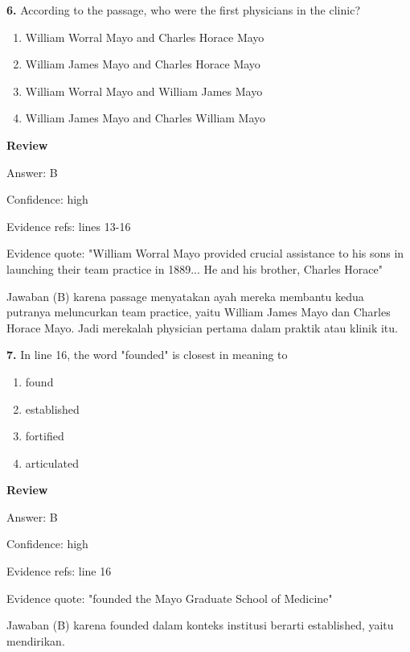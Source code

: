 \documentclass[12pt]{article}
\begin{document}
\vspace{0.25\baselineskip}
\noindent\textbf{6.} According to the passage, who were the first physicians in the clinic?
\begin{enumerate}[label=(\Alph*),leftmargin=*,itemsep=0.2em]
\item William Worral Mayo and Charles Horace Mayo
\item William James Mayo and Charles Horace Mayo
\item William Worral Mayo and William James Mayo
\item William James Mayo and Charles William Mayo
\end{enumerate}
\par
\begingroup
\setlength{\parskip}{0pt}
\setlength{\parindent}{0pt}
\textbf{Review}\par
Answer: B\par
Confidence: high\par
Evidence refs: lines 13-16\par
Evidence quote: "William Worral Mayo provided crucial assistance to his sons in launching their team practice in 1889... He and his brother, Charles Horace"\par
Jawaban (B) karena passage menyatakan ayah mereka membantu kedua putranya meluncurkan team practice, yaitu William James Mayo dan Charles Horace Mayo. Jadi merekalah physician pertama dalam praktik atau klinik itu.\par
\endgroup
\par
\vspace{0.25\baselineskip}
\noindent\textbf{7.} In line 16, the word "founded" is closest in meaning to
\begin{enumerate}[label=(\Alph*),leftmargin=*,itemsep=0.2em]
\item found
\item established
\item fortified
\item articulated
\end{enumerate}
\par
\begingroup
\setlength{\parskip}{0pt}
\setlength{\parindent}{0pt}
\textbf{Review}\par
Answer: B\par
Confidence: high\par
Evidence refs: line 16\par
Evidence quote: "founded the Mayo Graduate School of Medicine"\par
Jawaban (B) karena founded dalam konteks institusi berarti established, yaitu mendirikan.\par
\end{document}
